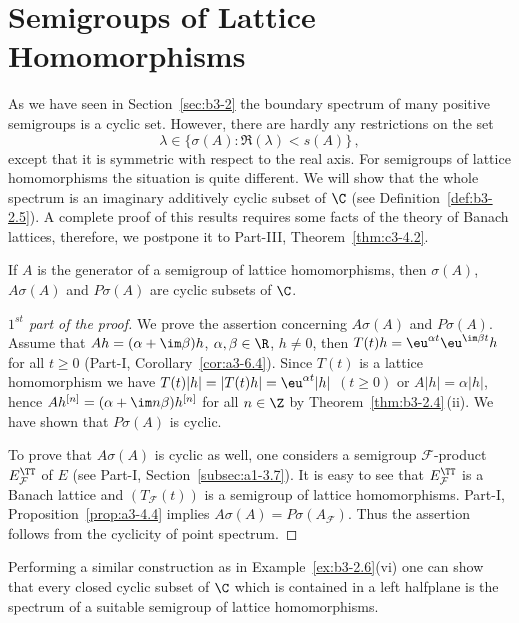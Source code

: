 \section{Semigroups of Lattice Homomorphisms}\label{sec:b3-4}%
As we have seen in Section~\ref{sec:b3-2} the boundary spectrum of many positive semigroups is a cyclic set.
However, there are hardly any restrictions on the set 
\[
\lambda \in \{ \sigma(A) \colon \Re(\lambda) < s(A)\}\,,
\] 
except that it is symmetric with respect to the real axis.
For semigroups of lattice homomorphisms the situation is quite different.
We will show that the whole spectrum is an imaginary additively cyclic 
subset of\/ $\C$ (see Definition~\ref{def:b3-2.5}).
A complete proof of this results requires some facts of the theory of Banach lattices, therefore, we postpone it to Part-III, Theorem~\ref{thm:c3-4.2}.
\begin{theorem}\label{thm:b3-4.1}
If\/ $A$ is the generator of a semigroup of lattice homomorphisms, then $\sigma(A)$, $A\sigma(A)$ and $P\sigma(A)$ are cyclic subsets of\/ $\C$.
\end{theorem}
\begin{proof}[$1^{st}$ part of the proof]
We prove the assertion concerning $A\sigma(A)$ and $P\sigma(A)$.
	Assume that $Ah = (\alpha + \im\beta)h$, $\alpha,\beta \in \R$, $h \neq 0$, then $T(t)h = \eu^{\alpha t}\eu^{\im\beta  t}h$ for all $t \geq 0$ (Part-I, Corollary~\ref{cor:a3-6.4}).
	Since $T(t)$ is a lattice homomorphism we have $T(t)|h| = |T(t)h| = \eu^{\alpha t}|h|$ $(t \geq 0)$ or $A|h| = \alpha|h|$, hence $Ah^{[n]} = (\alpha + \im n\beta)h^{[n]}$ for all $n \in \Z$ by Theorem~\ref{thm:b3-2.4}\,(ii).
	We have shown that $P\sigma(A)$ is cyclic.
	
	To prove that $A\sigma(A)$ is cyclic as well, one considers a semigroup $\mathcal{F}$-product $E_{\mathcal{F}}^{\TT}$ of\/ $E$ 
	(see Part-I, Section~\ref{subsec:a1-3.7}).
	It is easy to see that $E_{\mathcal{F}}^{\TT}$ is a Banach lattice 
	and $(T_{\mathcal{F}}(t))$ is a semigroup of lattice homomorphisms.
	Part-I, Proposition~\ref{prop:a3-4.4} implies $A\sigma(A) = P\sigma(A_{\mathcal{F}})$.
	Thus the assertion follows from the cyclicity of point spectrum.
\end{proof}
Performing a similar construction as in Example~\ref{ex:b3-2.6}(vi) one can show that every closed cyclic subset of\/ $\C$  which is contained in a left halfplane is the spectrum of a suitable semigroup of lattice homomorphisms. 
